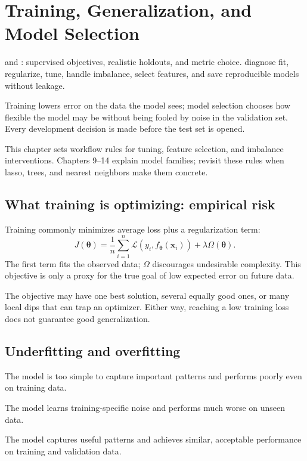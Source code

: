 \chapter{Training, Generalization, and Model Selection}
\label{ch:training}

\chapterguide%
  { and : supervised objectives, realistic holdouts, and metric choice.}
  {diagnose fit, regularize, tune, handle imbalance, select features, and save reproducible models without leakage.}

Training lowers error on the data the model sees; model selection chooses how flexible the model may be without being fooled by noise in the validation set. Every development decision is made before the test set is opened.

\begin{coursechoice}
This chapter sets workflow rules for tuning, feature selection, and imbalance interventions. Chapters 9--14 explain model families; revisit these rules when lasso, trees, and nearest neighbors make them concrete.
\end{coursechoice}

\section{What training is optimizing: empirical risk}

Training commonly minimizes average loss plus a regularization term:
\[
  J(\bm{\theta})
  =\frac{1}{n}\sum_{i=1}^{n}
  \mathcal{L}(y_i,f_{\bm{\theta}}(\bm{x}_i))
  +\lambda\Omega(\bm{\theta}).
\]
The first term fits the observed data; $\Omega$ discourages undesirable complexity. This objective is only a proxy for the true goal of low expected error on future data.

The objective may have one best solution, several equally good ones, or many local dips that can trap an optimizer. Either way, reaching a low training loss does not guarantee good generalization.

\section{Underfitting and overfitting}

\begin{description}[leftmargin=1.15in,style=nextline]
  \item[Underfitting] The model is too simple to capture important patterns and performs poorly even on training data.
  \item[Overfitting] The model learns training-specific noise and performs much worse on unseen data.
  \item[Good fit] The model captures useful patterns and achieves similar, acceptable performance on training and validation data.
\end{description}

